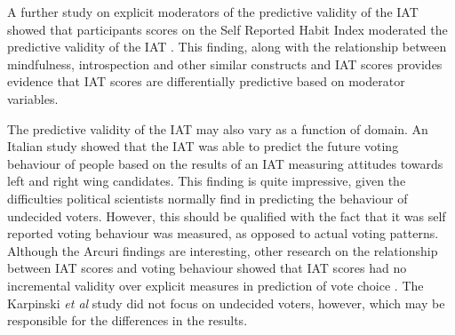 

A further study on explicit moderators of the predictive validity of the IAT showed that participants scores on the Self Reported Habit Index moderated the predictive validity of the IAT \cite{Conner2007}. This finding, along with the relationship between mindfulness, introspection and other similar constructs and IAT scores provides evidence that IAT scores are differentially predictive based on moderator variables. 



The predictive validity of the IAT may also vary as a function of domain. An Italian study \cite{Arcuri2008} showed that the IAT was able to predict the future voting behaviour of people based on the results of an IAT measuring attitudes towards left and right wing candidates. This finding is quite impressive, given the difficulties political scientists normally find in predicting the behaviour of undecided voters. However, this should be qualified with the fact that it was self reported voting behaviour was measured, as opposed to actual voting patterns. Although the Arcuri findings are interesting, other research on  the relationship between IAT scores and voting behaviour showed that IAT scores had no incremental validity over explicit measures in prediction of vote choice \cite{Karpinski2005}. The Karpinski \textit{et al } study did not focus on undecided voters, however, which may be responsible for the differences in the results. 


